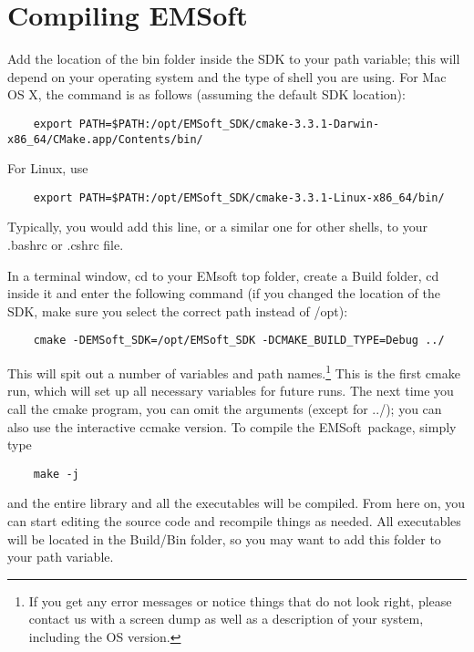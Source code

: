 \documentclass[DIV=calc, paper=letter, fontsize=11pt]{scrartcl}	 %
\newcommand{\ctp}{\textsf{EMSoft}}
\newcommand{\ctpb}{\textbf{\textsf{EMSoft}}}
\begin{document}
\section{Compiling \ctpb\label{sec:compile}}
Add the location of the bin folder inside the SDK to your path variable; this will depend on your operating system and the type 
of shell you are using.  For Mac OS X, the command is as follows (assuming the default SDK location):
\begin{verbatim}
	export PATH=$PATH:/opt/EMSoft_SDK/cmake-3.3.1-Darwin-x86_64/CMake.app/Contents/bin/
\end{verbatim}
For Linux, use
\begin{verbatim}
	export PATH=$PATH:/opt/EMSoft_SDK/cmake-3.3.1-Linux-x86_64/bin/
\end{verbatim}
Typically, you would add this line, or a similar one for other shells, to your \textsf{.bashrc} or \textsf{.cshrc} file.

In a terminal window, cd to your \textsf{EMsoft} top folder, create a \textsf{Build} folder, cd inside it and enter the following command (if you changed the 
location of the SDK, make sure you select the correct path instead of \textsf{/opt}):
\begin{verbatim}
	cmake -DEMSoft_SDK=/opt/EMSoft_SDK -DCMAKE_BUILD_TYPE=Debug ../
\end{verbatim}
This will spit out a number of variables and path names.\footnote{If you get any error messages or notice things that do not look right, please contact us with a 
screen dump as well as a description of your system, including the OS version.} This is the first cmake run, which will set up all necessary variables
for future runs.  The next time you call the cmake program, you can omit the arguments (except for ../); you can also use the interactive ccmake version.
To compile the \ctp\ package, simply type
\begin{verbatim}
	make -j
\end{verbatim}
and the entire library and all the executables will be compiled.  From here on, you can start editing the source code and recompile things as needed.
All executables will be located in the \textsf{Build/Bin} folder, so you may want to add this folder to your path variable.
\end{document}
